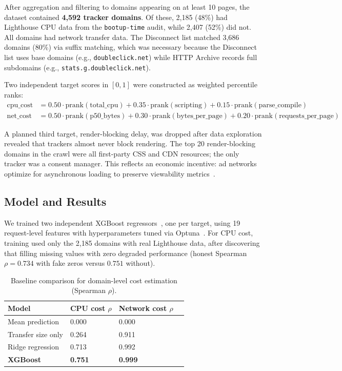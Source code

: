 \documentclass[11pt]{article}
\begin{document}
After aggregation and filtering to domains appearing on at least 10 pages, the dataset contained \textbf{4,592 tracker domains}. Of these, 2,185 (48\%) had Lighthouse CPU data from the \texttt{bootup-time} audit, while 2,407 (52\%) did not. All domains had network transfer data. The Disconnect list matched 3,686 domains (80\%) via suffix matching, which was necessary because the Disconnect list uses base domains (e.g., \texttt{doubleclick.net}) while HTTP Archive records full subdomains (e.g., \texttt{stats.g.doubleclick.net}).

Two independent target scores in $[0, 1]$ were constructed as weighted percentile ranks:
\begin{align}
    \text{cpu\_cost} &= 0.50 \cdot \text{prank}(\text{total\_cpu}) + 0.35 \cdot \text{prank}(\text{scripting}) + 0.15 \cdot \text{prank}(\text{parse\_compile}) \\
    \text{net\_cost} &= 0.50 \cdot \text{prank}(\text{p50\_bytes}) + 0.30 \cdot \text{prank}(\text{bytes\_per\_page}) + 0.20 \cdot \text{prank}(\text{requests\_per\_page})
\end{align}

A planned third target, render-blocking delay, was dropped after data exploration revealed that trackers almost never block rendering. The top 20 render-blocking domains in the crawl were all first-party CSS and CDN resources; the only tracker was a consent manager. This reflects an economic incentive: ad networks optimize for asynchronous loading to preserve viewability metrics~\citep{sullivan2020cwv}.

\subsection{Model and Results}

We trained two independent XGBoost regressors~\citep{chen2016xgboost}, one per target, using 19 request-level features with hyperparameters tuned via Optuna~\citep{akiba2019optuna}. For CPU cost, training used only the 2,185 domains with real Lighthouse data, after discovering that filling missing values with zero degraded performance (honest Spearman $\rho = 0.734$ with fake zeros versus $0.751$ without).

\begin{table}[h]
\centering
\small
\begin{tabular}{llll}
\toprule
Model & CPU cost $\rho$ & Network cost $\rho$ \\
\midrule
Mean prediction & 0.000 & 0.000 \\
Transfer size only & 0.264 & 0.911 \\
Ridge regression & 0.713 & 0.992 \\
\textbf{XGBoost} & \textbf{0.751} & \textbf{0.999} \\
\bottomrule
\end{tabular}
\caption{Baseline comparison for domain-level cost estimation (Spearman $\rho$).}
\label{tab:domain-baselines}
\end{table}
\end{document}
